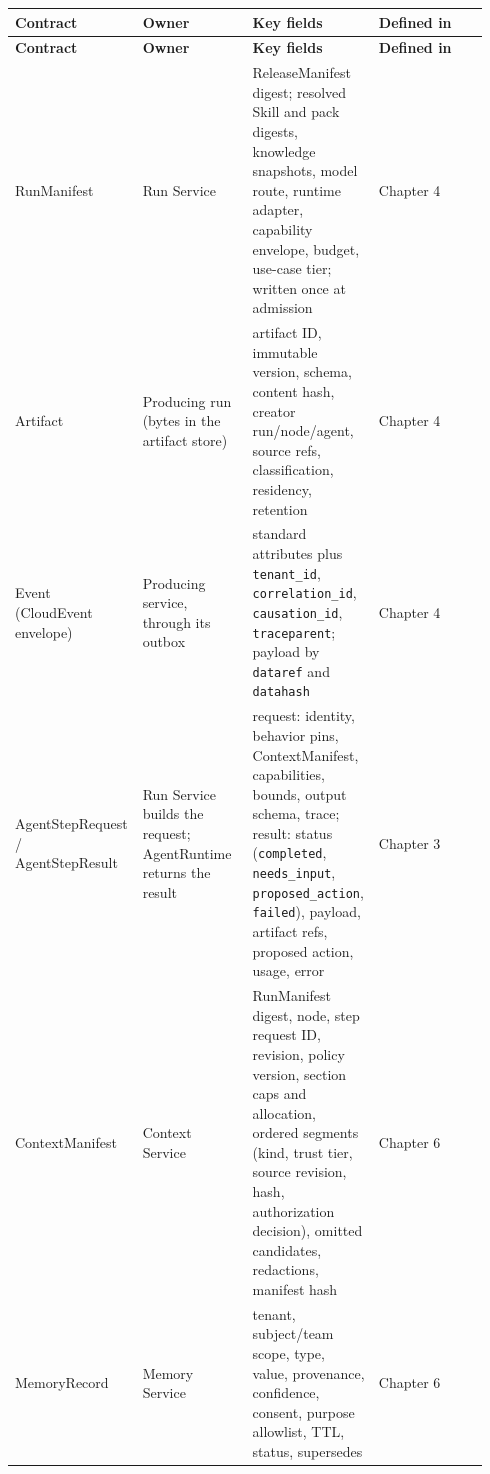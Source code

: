 \BookTableStart
\fontsize{7.2}{9}\selectfont
\begin{longtable}{@{}Y{0.2350\linewidth}Y{0.2350\linewidth}Y{0.2350\linewidth}Y{0.2350\linewidth}@{}}
\color{white}\bfseries \textbf{Contract} & \color{white}\bfseries \textbf{Owner} & \color{white}\bfseries \textbf{Key fields} & \color{white}\bfseries \textbf{Defined in} \\
\endfirsthead
{}
\color{white}\bfseries \textbf{Contract} & \color{white}\bfseries \textbf{Owner} & \color{white}\bfseries \textbf{Key fields} & \color{white}\bfseries \textbf{Defined in} \\
\endhead
RunManifest & Run Service & ReleaseManifest digest; resolved Skill and pack digests, knowledge snapshots, model route, runtime adapter, capability envelope, budget, use-case tier; written once at admission & Chapter 4 \\
Artifact & Producing run (bytes in the artifact store) & artifact ID, immutable version, schema, content hash, creator run/node/agent, source refs, classification, residency, retention & Chapter 4 \\
Event (CloudEvent envelope) & Producing service, through its outbox & standard attributes plus \lstinline[style=bookinline]!tenant_id!, \lstinline[style=bookinline]!correlation_id!, \lstinline[style=bookinline]!causation_id!, \lstinline[style=bookinline]!traceparent!; payload by \lstinline[style=bookinline]!dataref! and \lstinline[style=bookinline]!datahash! & Chapter 4 \\
AgentStepRequest / AgentStepResult & Run Service builds the request; AgentRuntime returns the result & request: identity, behavior pins, ContextManifest, capabilities, bounds, output schema, trace; result: status (\lstinline[style=bookinline]!completed!, \lstinline[style=bookinline]!needs_input!, \lstinline[style=bookinline]!proposed_action!, \lstinline[style=bookinline]!failed!), payload, artifact refs, proposed action, usage, error & Chapter 3 \\
ContextManifest & Context Service & RunManifest digest, node, step request ID, revision, policy version, section caps and allocation, ordered segments (kind, trust tier, source revision, hash, authorization decision), omitted candidates, redactions, manifest hash & Chapter 6 \\
MemoryRecord & Memory Service & tenant, subject/team scope, type, value, provenance, confidence, consent, purpose allowlist, TTL, status, supersedes & Chapter 6 \\

\end{longtable}

